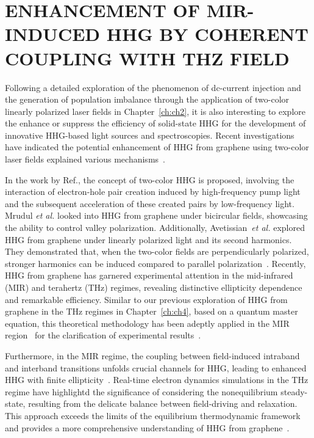 \chapter{ENHANCEMENT OF MIR-INDUCED HHG BY COHERENT COUPLING WITH THZ FIELD \label{ch:ch5}}

Following a detailed exploration of the phenomenon of dc-current injection and the generation of
population imbalance through the application of two-color linearly polarized laser fields in
Chapter~\ref{ch:ch2}, it is also interesting to explore the enhance or suppress the efficiency of solid-state \gls{HHG} for the development of innovative HHG-based light sources and spectroscopies. Recent investigations have indicated the potential enhancement of HHG from graphene using two-color laser fields explained various mechanisms~\cite{PhysRevB.100.035434,Mrudul:21,PhysRevB.105.195405}.

In the work by Ref.\cite{PhysRevB.100.035434}, the concept of two-color HHG is proposed, involving the interaction of electron-hole pair creation induced by high-frequency pump light and the subsequent acceleration of these created pairs by low-frequency light. Mrudul \textit{et al.} looked into HHG from graphene under bicircular fields, showcasing the ability to control valley polarization\cite{Mrudul:21}. Additionally, Avetissian~\textit{et al.} explored HHG from graphene under linearly polarized light and its second harmonics. They demonstrated that, when the two-color fields are perpendicularly polarized, stronger harmonics can be induced compared to parallel polarization~\cite{PhysRevB.105.195405}.
Recently, \gls{HHG} from graphene has garnered experimental attention in the
mid-infrared (MIR)\cite{doi:10.1126/science.aam8861,cha2022gate} and terahertz
(THz)\cite{Hafez2018,doi:10.1126/sciadv.abf9809} regimes, revealing distinctive ellipticity
dependence and remarkable efficiency. Similar to our previous exploration of HHG from graphene in
the THz regimes in Chapter~\ref{ch:ch4}, based on a quantum master equation, this theoretical methodology has been adeptly applied in the MIR region~\cite{PhysRevB.103.L041408} for the clarification of experimental results~\cite{doi:10.1126/science.aam8861,cha2022gate}.

Furthermore, in the MIR regime, the coupling between field-induced intraband and interband transitions unfolds crucial channels for HHG, leading to enhanced HHG with finite ellipticity~\cite{PhysRevB.103.L041408}. Real-time electron dynamics simulations in the THz regime have highlightd the significance of considering the nonequilibrium steady-state, resulting from the delicate balance between field-driving and relaxation. This approach exceeds the limits of the equilibrium thermodynamic framework and provides a more comprehensive understanding of HHG from graphene~\cite{PhysRevB.106.024313}.

